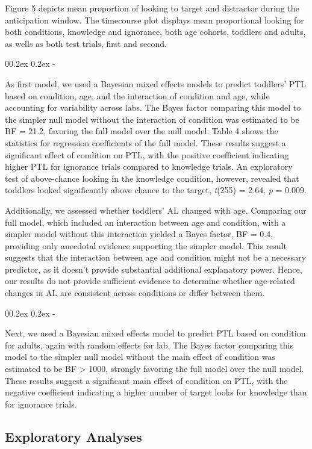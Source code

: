 \documentclass[
  man,floatsintext]{apa6}
\makeatletter
\let\oldsubparagraph\subparagraph
\renewcommand{\subparagraph}{
    \@ifstar
      \xxxSubParagraphStar
      \xxxSubParagraphNoStar
  }
\newcommand{\xxxSubParagraphStar}[1]{\oldsubparagraph*{#1}\mbox{}}
\newcommand{\xxxSubParagraphNoStar}[1]{\oldsubparagraph{#1}\mbox{}}
\renewcommand{\subparagraph}[1]{\@startsection{subparagraph}{5}{1em}%
  {0\baselineskip \@plus 0.2ex \@minus 0.2ex}%
  {-\z@\relax}%
  {\normalfont\normalsize\itshape\hspace{\parindent}{#1}\textit{\addperi}}{\relax}}
\makeatother
\begin{document}
Figure 5 depicts mean proportion of looking to target and distractor during the anticipation window. The timecourse plot displays mean proportional looking for both conditions, knowledge and ignorance, both age cohorts, toddlers and adults, as wells as both test trials, first and second.

\subparagraph{Toddlers}\label{toddlers-3}

As first model, we used a Bayesian mixed effects models to predict toddlers' PTL based on condition, age, and the interaction of condition and age, while accounting for variability across labs. The Bayes factor comparing this model to the simpler null model without the interaction of condition was estimated to be BF = 21.2, favoring the full model over the null model. Table 4 shows the statistics for regression coefficients of the full model. These results suggest a significant effect of condition on PTL, with the positive coefficient indicating higher PTL for ignorance trials compared to knowledge trials. An exploratory test of above-chance looking in the knowledge condition, however, revealed that toddlers looked significantly above chance to the target, \emph{t}(255) = 2.64, \emph{p} = 0.009.

Additionally, we assessed whether toddlers' AL changed with age. Comparing our full model, which included an interaction between age and condition, with a simpler model without this interaction yielded a Bayes factor, BF = 0.4, providing only anecdotal evidence supporting the simpler model. This result suggests that the interaction between age and condition might not be a necessary predictor, as it doesn't provide substantial additional explanatory power. Hence, our results do not provide sufficient evidence to determine whether age-related changes in AL are consistent across conditions or differ between them.

\subparagraph{Adults}\label{adults-3}

Next, we used a Bayesian mixed effects model to predict PTL based on condition for adults, again with random effects for lab. The Bayes factor comparing this model to the simpler null model without the main effect of condition was estimated to be BF \textgreater{} 1000, strongly favoring the full model over the null model. These results suggest a significant main effect of condition on PTL, with the negative coefficient indicating a higher number of target looks for knowledge than for ignorance trials.

\subsection{Exploratory Analyses}\label{exploratory-analyses}
\end{document}
